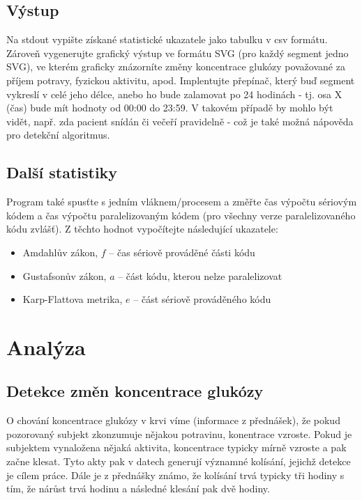 \documentclass{article}
\begin{document}
	\subsection{Výstup}
	Na stdout vypište získané statistické ukazatele jako tabulku v csv formátu. 
	Zároveň vygenerujte grafický výstup ve formátu SVG (pro každý segment jedno SVG), ve kterém graficky znázorníte změny koncentrace glukózy považované za příjem potravy, fyzickou aktivitu, apod. 
	Implentujte přepínač, který buď segment vykreslí v celé jeho délce, anebo ho bude zalamovat po 24 hodinách - tj. osa X (čas) bude mít hodnoty od 00:00 do 23:59. 
	V takovém případě by mohlo být vidět, např. zda pacient snídán či večeří pravidelně - což je také možná nápověda pro detekční algoritmus.
	
	\subsection{Další statistiky}
	Program také spusťte s jedním vláknem/procesem a změřte čas výpočtu sériovým kódem a čas výpočtu paralelizovaným kódem (pro všechny verze paralelizovaného kódu zvlášť). 
	Z těchto hodnot vypočítejte následující ukazatele:
	
	\begin{itemize}  
		\item Amdahlův zákon, $f$ -- čas sériově prováděné části kódu
		\item Gustafsonův zákon, $a$ -- část kódu, kterou nelze paralelizovat
		\item Karp-Flattova metrika, $e$ -- část sériově prováděného kódu
	\end{itemize}
	\newpage
	\section{Analýza}
	\subsection{Detekce změn koncentrace glukózy}
	O chování koncentrace glukózy v krvi víme (informace z přednášek), že pokud pozorovaný subjekt zkonzumuje nějakou potravinu, konentrace vzroste. 
	Pokud je subjektem vynaložena nějaká aktivita, koncentrace typicky mírně vzroste a pak začne klesat. Tyto akty pak v datech generují významné kolísání, jejichž detekce je cílem práce. Dále je z přednášky známo, že kolísání trvá typicky tři hodiny s tím, že nárůst trvá hodinu a následné klesání pak dvě hodiny. 
	
\end{document}
